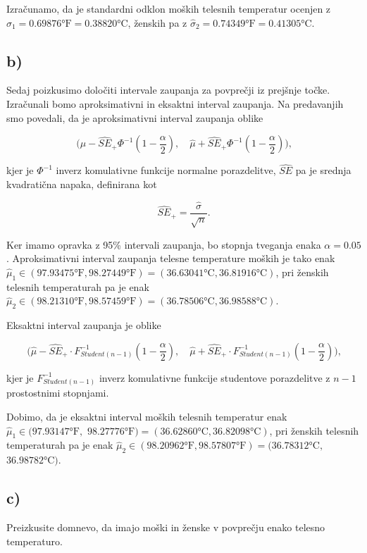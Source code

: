 \documentclass[12pt, a4paper]{article}
\begin{document}
Izračunamo, da je standardni odklon moških telesnih temperatur ocenjen z
$\hat{\sigma}_1 = 0.69876\text{°F} = 0.38820$°C, ženskih pa z 
$\hat{\sigma}_2 = 0.74349\text{°F} = 0.41305$°C.


\subsection*{b)}

Sedaj poizkusimo določiti intervale zaupanja za povprečji iz prejšnje točke. Izračunali
bomo aproksimativni in eksaktni interval zaupanja. Na predavanjih smo povedali, da je 
aproksimativni interval zaupanja oblike  

$$ \Big(\hat{\mu} - \widehat{SE}_+ \Phi^{-1}(1-\frac{\alpha}{2}), \quad 
\hat{\mu} + \widehat{SE}_+ \Phi^{-1}(1-\frac{\alpha}{2})\Big) \text{,}
$$

kjer je $\Phi^{-1}$ inverz komulativne funkcije normalne porazdelitve, $\widehat{SE}$
pa je srednja kvadratična napaka, definirana kot

$$ \widehat{SE}_+ = \frac{\hat{\sigma}}{\sqrt{n}} \text{.}
$$

Ker imamo opravka z 95\% intervali zaupanja, bo stopnja tveganja enaka $\alpha = 0.05$.
Aproksimativni interval zaupanja telesne temperature moških je tako enak 
$\hat{\mu}_1 \in (97.93475\text{°F}, 98.27449\text{°F}) = 
(36.63041\text{°C}, 36.81916\text{°C})$, pri ženskih telesnih temperaturah
pa je enak $\hat{\mu}_2 \in (98.21310\text{°F}, 98.57459\text{°F}) = 
(36.78506\text{°C}, 36.98588\text{°C})$.

Eksaktni interval zaupanja je oblike 

$$ \Big(\hat{\mu} - \widehat{SE}_+ \cdot F_{Student(n-1)}^{-1}(1-\frac{\alpha}{2}), \quad 
\hat{\mu} + \widehat{SE}_+ \cdot F_{Student(n-1)}^{-1}(1-\frac{\alpha}{2})\Big) \text{,}
$$

kjer je $F_{Student(n-1)}^{-1}$ inverz komulativne funkcije studentove porazdelitve z
$n-1$ prostostnimi stopnjami.

Dobimo, da je eksaktni interval moških telesnih temperatur enak \\
$\hat{\mu}_1 \in (97.93147\text{°F},$ $98.27776\text{°F}) =  
(36.62860\text{°C}, 36.82098\text{°C})$, pri ženskih telesnih temperaturah
pa je enak $\hat{\mu}_2 \in (98.20962\text{°F}, 98.57807\text{°F}) = 
(36.78312\text{°C},$ $36.98782\text{°C})$.

\subsection*{c)}
Preizkusite domnevo, da imajo moški in ženske v povprečju enako telesno 
temperaturo.
\end{document}
